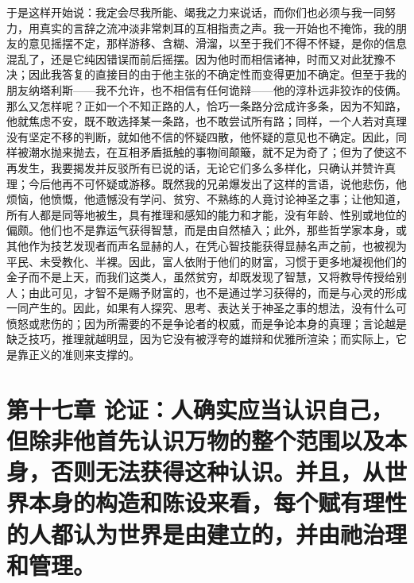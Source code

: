 于是这样开始说：我定会尽我所能、竭我之力来说话，而你们也必须与我一同努力，用真实的言辞之流冲淡非常刺耳的互相指责之声。我一开始也不掩饰，我的朋友的意见摇摆不定，那样游移、含糊、滑溜，以至于我们不得不怀疑，是你的信息混乱了，还是它纯因错误而前后摇摆。因为他时而相信诸神，时而又对此犹豫不决；因此我答复的直接目的由于他主张的不确定性而变得更加不确定。但至于我的朋友纳塔利斯——我不允许，也不相信有任何诡辩——他的淳朴远非狡诈的伎俩。那么又怎样呢？正如一个不知正路的人，恰巧一条路分岔成许多条，因为不知路，他就焦虑不安，既不敢选择某一条路，也不敢尝试所有路；同样，一个人若对真理没有坚定不移的判断，就如他不信的怀疑四散，他怀疑的意见也不确定。因此，同样被潮水抛来抛去，在互相矛盾抵触的事物间颠簸，就不足为奇了；但为了使这不再发生，我要揭发并反驳所有已说的话，无论它们多么多样化，只确认并赞许真理；今后他再不可怀疑或游移。既然我的兄弟爆发出了这样的言语，说他悲伤，他烦恼，他愤慨，他遗憾没有学问、贫穷、不熟练的人竟讨论神圣之事；让他知道，所有人都是同等地被生，具有推理和感知的能力和才能，没有年龄、性别或地位的偏颇。他们也不是靠运气获得智慧，而是由自然植入；此外，那些哲学家本身，或其他作为技艺发现者而声名显赫的人，在凭心智技能获得显赫名声之前，也被视为平民、未受教化、半裸。因此，富人依附于他们的财富，习惯于更多地凝视他们的金子而不是上天，而我们这类人，虽然贫穷，却既发现了智慧，又将教导传授给别人；由此可见，才智不是赐予财富的，也不是通过学习获得的，而是与心灵的形成一同产生的。因此，如果有人探究、思考、表达关于神圣之事的想法，没有什么可愤怒或悲伤的；因为所需要的不是争论者的权威，而是争论本身的真理；言论越是缺乏技巧，推理就越明显，因为它没有被浮夸的雄辩和优雅所渲染；而实际上，它是靠正义的准则来支撑的。\par


\section{第十七章 论证：人确实应当认识自己，但除非他首先认识万物的整个范围以及本身，否则无法获得这种认识。并且，从世界本身的构造和陈设来看，每个赋有理性的人都认为世界是由建立的，并由祂治理和管理。}

